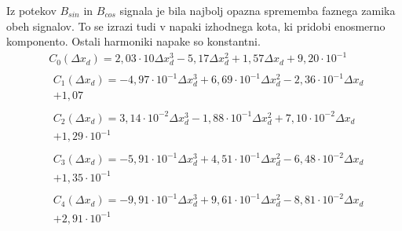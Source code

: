 Iz potekov $B_{sin}$ in $B_{cos}$ signala je bila najbolj opazna sprememba faznega zamika obeh signalov. To se izrazi tudi v napaki izhodnega kota, ki pridobi enosmerno komponento. Ostali harmoniki napake so konstantni.
\begin{eqnarray}
&C_0(\Delta x_d) =2,03\cdot 10\Delta x_d^{3}-5,17\Delta x_d^{2}+1,57\Delta x_d+9,20\cdot 10^{-1} \\                                
&\begin{split}C_1(\Delta x_d) =-4,97\cdot 10^{-1}\Delta x_d^{3}+6,69\cdot 10^{-1}\Delta x_d^{2}-2,36\cdot 10^{-1}\Delta x_d\\+1,07 \end{split}\\             
&\begin{split}C_2(\Delta x_d) =3,14\cdot 10^{-2}\Delta x_d^{3}-1,88\cdot 10^{-1}\Delta x_d^{2}+7,10\cdot 10^{-2}\Delta x_d\\+1,29\cdot 10^{-1} \end{split}\\ 
&\begin{split}C_3(\Delta x_d) =-5,91\cdot 10^{-1}\Delta x_d^{3}+4,51\cdot 10^{-1}\Delta x_d^{2}-6,48\cdot 10^{-2}\Delta x_d\\+1,35\cdot 10^{-1} \end{split}\\
&\begin{split}C_4(\Delta x_d) =-9,91\cdot 10^{-1}\Delta x_d^{3}+9,61\cdot 10^{-1}\Delta x_d^{2}-8,81\cdot 10^{-2}\Delta x_d\\+2,91\cdot 10^{-1}\end{split}
\end{eqnarray}

